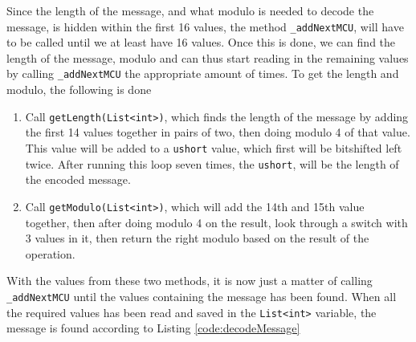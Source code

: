 Since the length of the message, and what modulo is needed to decode the message, is hidden within the first 16 values, the method \lstinline|_addNextMCU|, will have to be called until we at least have 16 values.
Once this is done, we can find the length of the message, modulo and can thus start reading in the remaining values by calling \lstinline|_addNextMCU| the appropriate amount of times.
To get the length and modulo, the following is done
\begin{enumerate}
	\item Call \lstinline|getLength(List<int>)|, which finds the length of the message by adding the first 14 values together in pairs of two, then doing modulo 4 of that value. 
	This value will be added to a \lstinline|ushort| value, which first will be bitshifted left twice. 
	After running this loop seven times, the \lstinline|ushort|, will be the length of the encoded message.
	\item Call \lstinline|getModulo(List<int>)|, which will add the 14th and 15th value together, then after doing modulo 4 on the result, look through a switch with 3 values in it, then return the right modulo based on the result of the operation.
\end{enumerate}
With the values from these two methods, it is now just a matter of calling \lstinline|_addNextMCU| until the values containing the message has been found.
When all the required values has been read and saved in the \lstinline|List<int>| variable, the message is found according to Listing \ref{code:decodeMessage}

